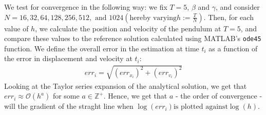 \documentclass[../Main.tex]{subfiles}
\begin{document}
We test for convergence in the following way: we fix $T = 5$, $\beta$ and $\gamma$, and consider $N = 16, 32, 64, 128, 256, 512,\mbox{ and } 1024 \left(\mbox{hereby varying} h := \frac{T}{N}\right)$. Then, for each value of $h$, we calculate the position and velocity of the pendulum at $T = 5$, and compare these values to the reference solution calculated using MATLAB's \texttt{ode45} function. We define the overall error in the estimation at time $t_{i}$ as a function of the error in displacement and velocity at $t_{i}$:
\begin{align*}
err_{i} = \sqrt{\left(err_{x_{i}}\right)^2 + \left(err_{v_{i}}\right)^2}
\end{align*}
Looking at the Taylor series expansion of the analytical solution, we get that $err_{i} \approx \mathcal{O}\left(h^a\right)$ for some $a \in \mathbb{Z}^{+}$. Hence, we get that $a$ - the order of convergence - will the gradient of the straght line when $\log\left(err_{i}\right) \mbox{is plotted against} \log\left(h\right)$.
\end{document}
